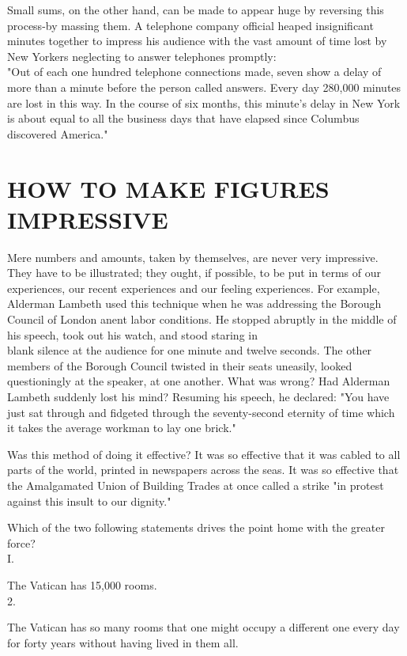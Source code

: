 \documentclass[10pt]{article}
\begin{document}
Small sums, on the other hand, can be made to appear huge by reversing this process-by massing them. A telephone company official heaped insignificant minutes together to impress his audience with the vast amount of time lost by New Yorkers neglecting to answer telephones promptly:\\
"Out of each one hundred telephone connections made, seven show a delay of more than a minute before the person called answers. Every day 280,000 minutes are lost in this way. In the course of six months, this minute's delay in New York is about equal to all the business days that have elapsed since Columbus discovered America."

\section*{HOW TO MAKE FIGURES IMPRESSIVE}
Mere numbers and amounts, taken by themselves, are never very impressive. They have to be illustrated; they ought, if possible, to be put in terms of our experiences, our recent experiences and our feeling experiences. For example, Alderman Lambeth used this technique when he was addressing the Borough Council of London anent labor conditions. He stopped abruptly in the middle of his speech, took out his watch, and stood staring in\\
blank silence at the audience for one minute and twelve seconds. The other members of the Borough Council twisted in their seats uneasily, looked questioningly at the speaker, at one another. What was wrong? Had Alderman Lambeth suddenly lost his mind? Resuming his speech, he declared: "You have just sat through and fidgeted through the seventy-second eternity of time which it takes the average workman to lay one brick."

Was this method of doing it effective? It was so effective that it was cabled to all parts of the world, printed in newspapers across the seas. It was so effective that the Amalgamated Union of Building Trades at once called a strike "in protest against this insult to our dignity."

Which of the two following statements drives the point home with the greater force?\\
I.

The Vatican has 15,000 rooms.\\
2.

The Vatican has so many rooms that one might occupy a different one every day for forty years without having lived in them all.
\end{document}
